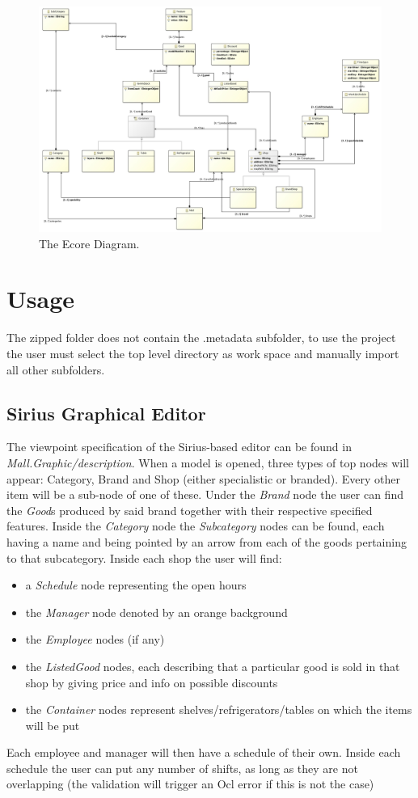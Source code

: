 \documentclass[a4paper]{article}
\begin{document}
\begin{figure}
	\includegraphics[width=\linewidth]{pictures/MallDsmclassdiagram.jpg}
	\caption{The Ecore Diagram.}
	\label{fig:mallDiag}
\end{figure}

\section{Usage}
The zipped folder does not contain the .metadata subfolder, to use the project the user must select the top level directory as work space and manually import all other subfolders.
\subsection{Sirius Graphical Editor}
The viewpoint specification of the Sirius-based editor can be found in \textit{Mall.Graphic/description}. When a model is opened, three types of top nodes will appear: Category, Brand and Shop (either specialistic or branded). Every other item will be a sub-node of one of these. Under the \textit{Brand} node the user can find the \textit{Good}s produced by said brand together with their respective specified features. Inside the \textit{Category} node the \textit{Subcategory} nodes can be found, each having a name and being pointed by an arrow from each of the goods pertaining to that subcategory. 
Inside each shop the user will find:
\begin{itemize}
	\item a \textit{Schedule} node representing the open hours
	\item the \textit{Manager} node denoted by an orange background
	\item the \textit{Employee} nodes (if any)
	\item the \textit{ListedGood} nodes, each describing that a particular good is sold in that shop by giving price and info on possible discounts
	\item the \textit{Container} nodes represent shelves/refrigerators/tables on which the items will be put
\end{itemize}
Each employee and manager will then have a schedule of their own. Inside each schedule the user can put any number of shifts, as long as they are not overlapping (the validation will trigger an Ocl error if this is not the case)
\end{document}
